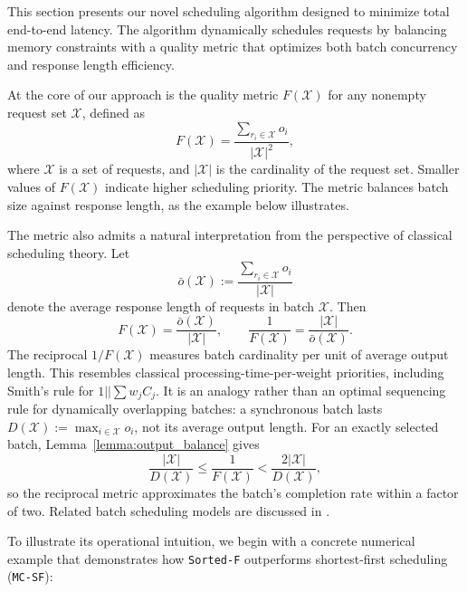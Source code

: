 \documentclass[nonblindrev]{informs3_hide}
\newcommand{\mcsdf}{\texttt{MC-SF}}
\newcommand{\sortF}{\texttt{Sorted-F}}
\begin{document}
This section presents our novel scheduling algorithm designed to minimize total end-to-end latency. The algorithm dynamically schedules requests by balancing memory constraints with a quality metric that optimizes both batch concurrency and response length efficiency.

At the core of our approach is the quality metric $F(\mathcal{X})$ for any nonempty request set $\mathcal{X}$, defined as
$$
F(\mathcal{X}) = \frac{\sum_{r_i \in \mathcal{X}} o_i}{|\mathcal{X}|^2},
$$
where $\mathcal{X}$ is a set of requests, and $|\mathcal{X}|$ is the cardinality of the request set.
Smaller values of $F(\mathcal{X})$ indicate higher scheduling priority. The metric balances batch size against response length, as the example below illustrates.

The metric also admits a natural interpretation from the perspective of classical scheduling theory. Let
\[
\bar{o}(\mathcal{X}) :=
\frac{\sum_{r_i\in \mathcal{X}} o_i}{|\mathcal{X}|}
\]
denote the average response length of requests in batch $\mathcal{X}$. Then
\[
F(\mathcal{X})
=
\frac{\bar{o}(\mathcal{X})}{|\mathcal{X}|},
\qquad
\frac{1}{F(\mathcal{X})}
=
\frac{|\mathcal{X}|}{\bar{o}(\mathcal{X})}.
\]
The reciprocal $1/F(\mathcal X)$ measures batch cardinality per unit of average output length. This resembles classical processing-time-per-weight priorities, including Smith's rule for $1||\sum w_jC_j$. It is an analogy rather than an optimal sequencing rule for dynamically overlapping batches: a synchronous batch lasts $D(\mathcal X):=\max_{i\in\mathcal X}o_i$, not its average output length. For an exactly selected batch, Lemma~\ref{lemma:output_balance} gives
\[
\frac{|\mathcal X|}{D(\mathcal X)}\le\frac1{F(\mathcal X)}
<\frac{2|\mathcal X|}{D(\mathcal X)},
\]
so the reciprocal metric approximates the batch's completion rate within a factor of two. Related batch scheduling models are discussed in \citep{brucker1998scheduling,chen2008logistics}.

To illustrate its operational intuition, we begin with a concrete numerical example that demonstrates how \sortF{} outperforms shortest-first scheduling (\mcsdf):
\end{document}
